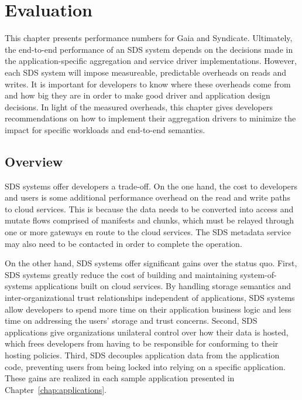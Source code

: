 \chapter{Evaluation}
\label{chap:evaluation}

This chapter presents performance numbers for Gaia and Syndicate.
Ultimately, the end-to-end performance of an SDS system depends on the decisions
made in the application-specific aggregation and service driver implementations.
 However, each SDS system will impose measureable, predictable overheads on
reads and writes.  It is important for developers to know where these overheads
come from and how big they are in order to make good driver and application design decisions.
In light of the measured overheads, this chapter gives developers
recommendations on how to implement their aggregation drivers to minimize the
impact for specific workloads and end-to-end semantics.

\section{Overview}

SDS systems offer developers a trade-off.  On the one hand, the cost to
developers and users is some additional performance overhead on the read and write paths to cloud services.
This is because the data needs to be converted
into access and mutate flows comprised of manifests and chunks, which must be
relayed through one or more gateways en route to the cloud services.
The SDS metadata service may also need to be contacted in order to
complete the operation.

On the other hand, SDS systems offer significant gains over the status quo.
First, SDS systems greatly reduce the cost of building and maintaining
system-of-systems applications built on cloud services.  By handling storage
semantics and inter-organizational trust relationships
independent of applications, SDS systems allow developers to spend more time on
their application business logic and less time on addressing the users'
storage and trust concerns.  Second, SDS applications
give organizations unilateral control over how
their data is hosted, which frees developers from having to be
responsible for conforming to their hosting policies.
Third, SDS decouples application data from the application
code, preventing users from being locked into relying on a specific
application.  These gains are realized in each
sample application presented in Chapter~\ref{chap:applications}.

